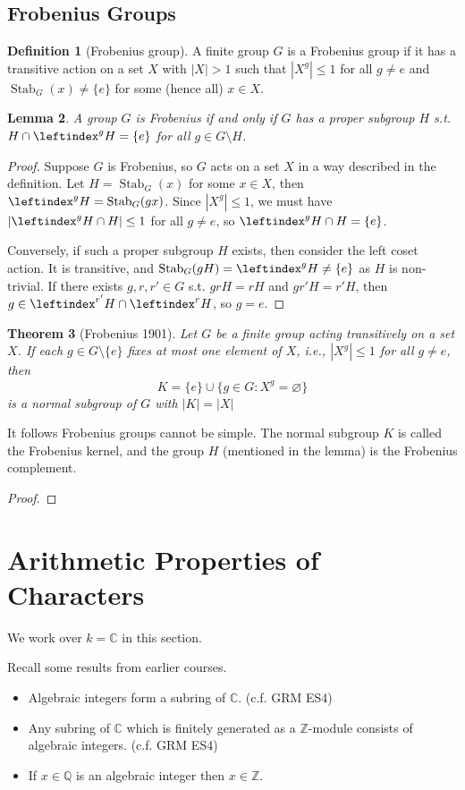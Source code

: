 \documentclass{article}
\theoremstyle{definition}
\newtheorem{defn}{Definition}[section]
\theoremstyle{remark}
\theoremstyle{plain}
\newtheorem{lem}[defn]{Lemma}
\newtheorem{thm}[defn]{Theorem}
\newcommand{\ZZ}{\mathbb{Z}}
\newcommand{\QQ}{\mathbb{Q}}
\newcommand{\CC}{\mathbb{C}}
\begin{document}
\subsection{Frobenius Groups}
\begin{defn}[Frobenius group]
    A finite group $G$ is a Frobenius group if it has a transitive action on a set $X$ with $|X|>1$ such that $|X^g|\le 1$ for all $g\neq e$ and $\operatorname{Stab}_G(x)\neq\{e\}$ for some (hence all) $x\in X$.
\end{defn}
\begin{lem}
    A group $G$ is Frobenius if and only if $G$ has a proper subgroup $H$ s.t. $H\cap\leftindex^gH=\{e\}$ for all $g\in G\setminus H$.
\end{lem}
\begin{proof}
    Suppose $G$ is Frobenius, so $G$ acts on a set $X$ in a way described in the definition. Let $H=\operatorname{Stab}_G(x)$ for some $x\in X$, then $\leftindex^gH=\operatorname{Stab}_G(gx)$. Since $|X^g|\le 1$, we must have $|\leftindex^gH\cap H|\le 1$ for all $g\neq e$, so $\leftindex^gH\cap H=\{e\}$.

    Conversely, if such a proper subgroup $H$ exists, then consider the left coset action. It is transitive, and $\operatorname{Stab}_G(gH)=\leftindex^gH\neq \{e\}$ as $H$ is non-trivial. If there exists $g,r,r'\in G$ s.t. $grH=rH$ and $gr'H=r'H$, then $g\in\leftindex^{r'}H\cap\leftindex^rH$, so $g=e$. 
\end{proof}
\begin{thm}[Frobenius 1901]
    Let $G$ be a finite group acting transitively on a set $X$. If each $g\in G\setminus\{e\}$ fixes at most one element of $X$, i.e., $|X^g|\le 1$ for all $g\neq e$, then
    \[K=\{e\}\cup\{g\in G:X^g=\varnothing\}\]
    is a normal subgroup of $G$ with $|K|=|X|$
\end{thm}
It follows Frobenius groups cannot be simple. The normal subgroup $K$ is called the Frobenius kernel, and the group $H$ (mentioned in the lemma) is the Frobenius complement.
\begin{proof}
    
\end{proof}

\section{Arithmetic Properties of Characters}
We work over $k=\CC$ in this section.

Recall some results from earlier courses.
\begin{itemize}
    \item Algebraic integers form a subring of $\CC$. (c.f. GRM ES4)
    \item Any subring of $\CC$ which is finitely generated as a $\ZZ$-module consists of algebraic integers. (c.f. GRM ES4)
    \item If $x\in\QQ$ is an algebraic integer then $x\in \ZZ$. 
\end{itemize}
\end{document}
